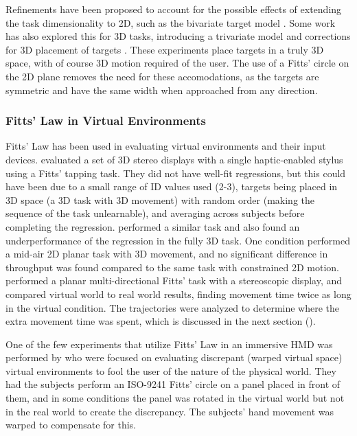 Refinements have been proposed to account for the possible effects of extending the task dimensionality to 2D, such as the bivariate target model \citep{accot_refining_2003, mackenzie_extending_1992, wobbrock_error_2008}.
Some work has also explored this for 3D tasks, introducing a trivariate model \citep{grossman_pointing_2004} and corrections for 3D placement of targets \citep{cha_extended_2013, murata_extending_2001}.
These experiments place targets in a truly 3D space, with of course 3D motion required of the user.
The use of a Fitts' circle on the 2D plane removes the need for these accomodations, as the targets are symmetric and have the same width when approached from any direction.

\subsubsection{Fitts' Law in Virtual Environments}\label{applying-fitts-to-virtual-environment}

Fitts' Law has been used in evaluating virtual environments and their input devices.
\citet{chun_evaluating_2004} evaluated a set of 3D stereo displays with a single haptic-enabled stylus using a Fitts' tapping task.
They did not have well-fit regressions, but this could have been due to a small range of ID values used (2-3), targets being placed in 3D space (a 3D task with 3D movement) with random order (making the sequence of the task unlearnable), and averaging across subjects before completing the regression.
\citet{teather_evaluating_2010} performed a similar task and also found an underperformance of the regression in the fully 3D task.
One condition performed a mid-air 2D planar task with 3D movement, and no significant difference in throughput was found compared to the same task with constrained 2D motion.
\citet{liu_comparing_2009} performed a planar multi-directional Fitts' task with a stereoscopic display, and compared virtual world to real world results, finding movement time twice as long in the virtual condition.
The trajectories were analyzed to determine where the extra movement time was spent, which is discussed in the next section ().

One of the few experiments that utilize Fitts' Law in an immersive HMD was performed by \citet{kohli_redirected_2012} who were focused on evaluating discrepant (warped virtual space) virtual environments to fool the user of the nature of the physical world.
They had the subjects perform an ISO-9241 Fitts' circle on a panel placed in front of them, and in some conditions the panel was rotated in the virtual world but not in the real world to create the discrepancy.
The subjects' hand movement was warped to compensate for this.

